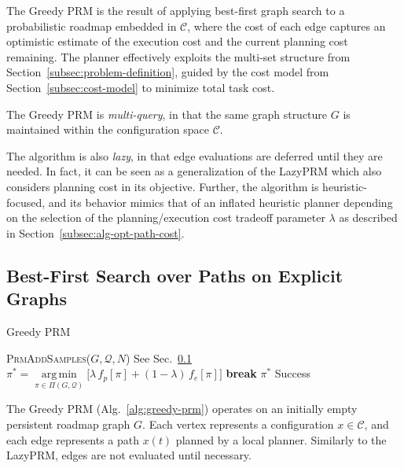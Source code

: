 \documentclass{report}
\DeclareMathOperator*{\argmin}{arg\,min}
\begin{document}
The Greedy PRM is the result of applying
best-first graph search to
a probabilistic roadmap \cite{kavrakietal1996prm}
embedded in $\mathcal{C}$,
where the cost of each edge captures an optimistic estimate of
the execution cost and the current planning cost remaining.
The planner effectively exploits the multi-set structure
from Section~\ref{subsec:problem-definition},
guided by the cost model from Section~\ref{subsec:cost-model}
to minimize total task cost.

The Greedy PRM is \emph{multi-query},
in that the same graph
structure $G$ is maintained within the configuration space
$\mathcal{C}$.

The algorithm is also \emph{lazy},
in that edge evaluations are deferred until they are needed.
In fact, it can be seen as a generalization of the
LazyPRM \cite{bohlin2000lazyprm}
which also considers planning cost in its objective.
Further,
the algorithm is heuristic-focused,
and its behavior mimics that of an inflated heuristic planner
depending on the selection of the planning/execution cost
tradeoff parameter $\lambda$
as described in Section~\ref{subsec:alg-opt-path-cost}.

\subsection{Best-First Search over Paths on Explicit Graphs}
\label{subsec:alg-greedy-prm}

\begin{algorithm}
\caption{Greedy PRM}
\label{alg:greedy-prm}
\begin{algorithmic}[1]
\Loop
   \State \textsc{PrmAddSamples}($G, \mathcal{Q}, N$)
      \Comment See Sec.~\ref{subsec:alg-greedy-prm}
   \Loop
         \label{line:best-first-start}
      \State $\pi^* = \argmin\limits_{\pi \in \Pi(G,\mathcal{Q})}
         \big[ \lambda \, f_p[\pi] + (1 - \lambda) \, f_e[\pi] \big]$
         \label{line:select-optimistic-path}
        \State \textbf{break}
      \EndIf
         \State \Return $\pi^*$
            \Comment Success
      \EndIf
   \EndLoop
      \label{line:best-first-end}
\EndLoop
\EndProcedure
\end{algorithmic}
\end{algorithm}

The Greedy PRM (Alg.~\ref{alg:greedy-prm})
operates on an initially empty persistent roadmap graph $G$.
Each vertex represents a configuration $x \in \mathcal{C}$,
and each edge represents a path $x(t)$ planned by a local planner.
Similarly to the LazyPRM,
edges are not evaluated until necessary.
\end{document}
